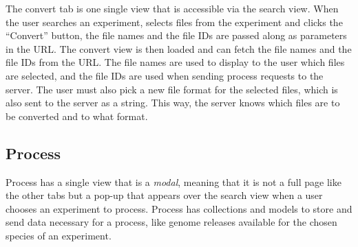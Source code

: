 The convert tab is one single view that is accessible via the search view. When the user searches an experiment, selects files from the experiment and clicks the “Convert” button, the file names and the file IDs are passed along as parameters in the URL. The convert view is then loaded and can fetch the file names and the file IDs from the URL. The file names are used to display to the user which files are selected, and the file IDs are used when sending process requests to the server. The user must also pick a new file format for the selected files, which is also sent to the server as a string. This way, the server knows which files are to be converted and to what format.

\subsection{Process}
Process has a single view that is a \textit{modal}, meaning that it is not a full page like the other tabs but a pop-up that appears over the search view when a user chooses an experiment to process. Process has collections and models to store and send data necessary for a process, like genome releases available for the chosen species of an experiment.